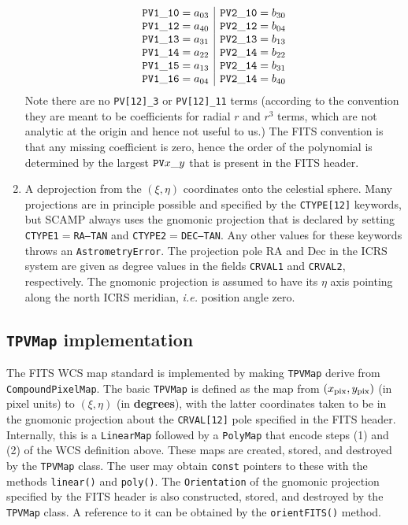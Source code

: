 \documentclass[11pt,preprint,flushrt]{aastex}
\begin{document}
\begin{enumerate}
\begin{equation}
\begin{array}{c|c}
{\tt PV1\_10} = a_{03} & {\tt PV2\_10} = b_{30} \\
{\tt PV1\_12} = a_{40} & {\tt PV2\_12} = b_{04} \\
{\tt PV1\_13} = a_{31} & {\tt PV2\_13} = b_{13} \\
{\tt PV1\_14} = a_{22} & {\tt PV2\_14} = b_{22} \\
{\tt PV1\_15} = a_{13} & {\tt PV2\_14} = b_{31} \\
{\tt PV1\_16} = a_{04} & {\tt PV2\_14} = b_{40}
\end{array}
\end{equation}
Note there are no {\tt PV[12]\_3} or {\tt PV[12]\_11} terms (according to the convention they are meant to be coefficients for radial $r$ and $r^3$ terms, which are not analytic at the origin and hence not useful to us.)  The FITS convention is that any missing coefficient is zero, hence the order of the polynomial is determined by the largest ${\tt PV}x\_y$ that is present in the FITS header.
\item A deprojection from the $(\xi,\eta)$ coordinates onto the celestial sphere.  Many projections are in principle possible and specified by the {\tt CTYPE[12]} keywords, but SCAMP always uses the gnomonic projection that is declared by setting {\tt CTYPE1}$=${\tt RA---TAN} and {\tt CTYPE2}$=${\tt DEC--TAN}.  Any other values for these keywords throws an {\tt AstrometryError}.  The projection pole RA and Dec in the ICRS system are given as degree values in the fields {\tt CRVAL1} and {\tt CRVAL2}, respectively.  The gnomonic projection is assumed to have its $\eta$ axis pointing along the north ICRS meridian, {\it i.e.} position angle zero.
\end{enumerate}

\subsection{{\tt TPVMap} implementation}
The FITS WCS map standard is implemented by making {\tt TPVMap} derive from {\tt CompoundPixelMap}.  The basic {\tt TPVMap} is defined as the map from $(x_{\rm pix}, y_{\rm pix})$ (in pixel units) to $(\xi,\eta)$ (in {\bf degrees}), with the latter coordinates taken to be in the gnomonic projection about the {\tt CRVAL[12]} pole specified in the FITS header.  Internally, this is a {\tt LinearMap} followed by a {\tt PolyMap} that encode steps (1) and (2) of the WCS definition above.  These maps are created, stored, and destroyed by the {\tt TPVMap} class.  The user may obtain {\tt const} pointers to these with the methods {\tt linear()} and {\tt poly()}.  The {\tt Orientation} of the gnomonic projection specified by the FITS header is also constructed, stored, and destroyed by the {\tt TPVMap} class.  A reference to it can be obtained by the {\tt orientFITS()} method.
\end{document}
